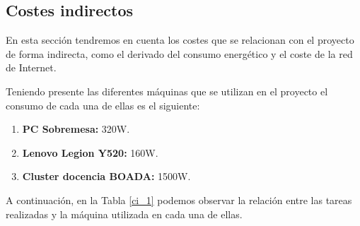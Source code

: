 \documentclass[titlepage,12pt]{report}
\begin{document}
\begin{table}[H]
	\centering
	\caption{Coste recursos de RRHH}
	\label{rrhh_1}
\end{table}

\subsection{Costes indirectos}

En esta sección tendremos en cuenta los costes que se relacionan con el proyecto de forma indirecta, como el derivado del consumo energético y el coste de la red de Internet.

Teniendo presente las diferentes máquinas que se utilizan en el proyecto el consumo de cada una de ellas es el siguiente:

\begin{enumerate}
	\item \textbf{PC Sobremesa:} 320W.
	\item \textbf{Lenovo Legion Y520:} 160W.
	\item \textbf{Cluster docencia BOADA:} 1500W.
\end{enumerate}

A continuación, en la Tabla \ref{ci_1} podemos observar la relación entre las tareas realizadas y la máquina utilizada en cada una de ellas.

\begin{table}[H]
	\centering
	\caption{Horas por tarea y recurso}
	\label{ci_1}
\end{table}
\end{document}
